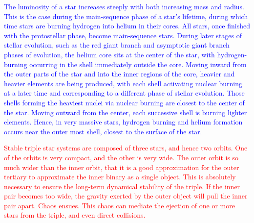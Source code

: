 \documentclass[main.tex]{subfiles}
\begin{document}
\begin{tcolorbox}[sharp corners, colback=blue!30, colframe=blue!80!blue, title=Dependence of Luminosity on Mass and Radius$^{16}$]
\par \textcolor{blue} {The luminosity of a star increases steeply with both increasing mass and radius.  This is the case during the main-sequence phase of a star's lifetime, during which time stars are burning hydrogen into helium in their cores.  All stars, once finished with the protostellar phase, become main-sequence stars.  During later stages of stellar evolution, such as the red giant branch and asymptotic giant branch phases of evolution, the helium core sits at the center of the star, with hydrogen-burning occurring in the shell immediately outside the core.  Moving inward from the outer parts of the star and into the inner regions of the core, heavier and heavier elements are being produced, with each shell activating nuclear burning at a later time and corresponding to a different phase of stellar evolution.  Those shells forming the heaviest nuclei via nuclear burning are closest to the center of the star.  Moving outward from the center, each successive shell is burning lighter elements.  Hence, in very massive stars, hydrogen burning and helium formation occurs near the outer most shell, closest to the surface of the star.}
\end{tcolorbox}

\begin{tcolorbox}[sharp corners, colback=red!30, colframe=red!80!blue, title=Dynamical Stability$^{17}$]
\par \textcolor{red} {Stable triple star systems are composed of three stars, and hence two orbits.  One of the orbits is very compact, and the other is very wide.  The outer orbit is so much wider than the inner orbit, that it is a good approximation for the outer tertiary to approximate the inner binary as a single object.  This is absolutely necessary to ensure the long-term dynamical stability of the triple.  If the inner pair becomes too wide, the gravity exerted by the outer object will pull the inner pair apart.  Chaos ensues.  This chaos can mediate the ejection of one or more stars from the triple, and even direct collisions.}  
\end{tcolorbox}
\end{document}
